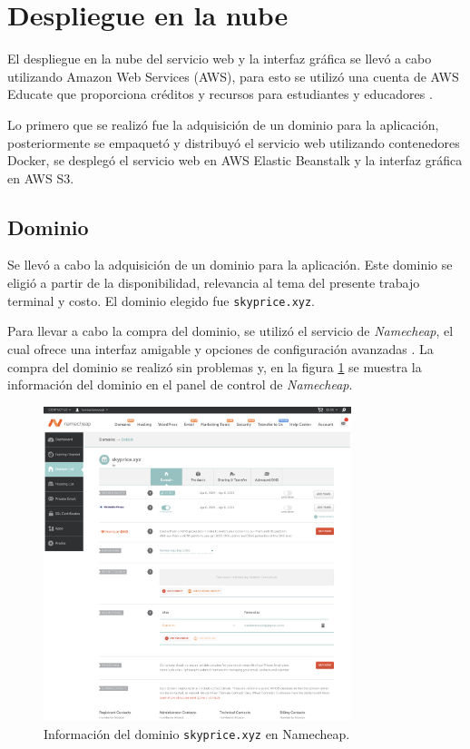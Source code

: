 \section{Despliegue en la nube}
El despliegue en la nube del servicio web y la interfaz gráfica se llevó a cabo
utilizando Amazon Web Services (AWS), para esto se utilizó una cuenta de AWS Educate
que proporciona créditos y recursos para estudiantes y educadores \cite{aws_educate}.

Lo primero que se realizó fue la adquisición de un dominio para la aplicación,
posteriormente se empaquetó y distribuyó el servicio web utilizando contenedores
Docker, se desplegó el servicio web en AWS Elastic Beanstalk y la interfaz gráfica
en AWS S3.

\subsection{Dominio}
Se llevó a cabo la adquisición de un dominio para la aplicación. Este dominio
se eligió a partir de la disponibilidad, relevancia al tema del presente
trabajo terminal y costo. El dominio elegido fue \texttt{skyprice.xyz}.

Para llevar a cabo la compra del dominio, se utilizó el servicio de
\textit{Namecheap}, el cual ofrece una interfaz amigable y opciones de
configuración avanzadas \cite{namecheap}. La compra del dominio se realizó sin problemas y, en
la figura \ref{fig:skyprice-xyz} se muestra la información del dominio en el
panel de control de \textit{Namecheap}.

\begin{figure}[H]
    \centering
    \includegraphics[width=0.8\textwidth]{imagenes/05-implementacion/despliegue/namecheapskypricexyz.png}
    \caption{Información del dominio \texttt{skyprice.xyz} en Namecheap.}
    \label{fig:skyprice-xyz}
\end{figure}

